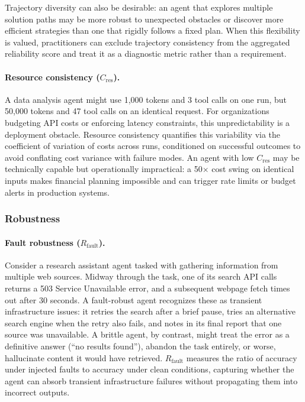 \documentclass[11pt]{article}
\begin{document}
Trajectory diversity can also be desirable: an agent that explores multiple solution paths may be more robust to unexpected obstacles or discover more efficient strategies than one that rigidly follows a fixed plan. When this flexibility is valued, practitioners can exclude trajectory consistency from the aggregated reliability score and treat it as a diagnostic metric rather than a requirement.

\paragraph{Resource consistency ($C_{\text{res}}$).}
A data analysis agent might use 1{,}000 tokens and 3 tool calls on one run, but 50{,}000 tokens and 47 tool calls on an identical request.
For organizations budgeting API costs or enforcing latency constraints, this unpredictability is a deployment obstacle.
Resource consistency quantifies this variability via the coefficient of variation of costs across runs, conditioned on successful outcomes to avoid conflating cost variance with failure modes.
An agent with low $C_{\text{res}}$ may be technically capable but operationally impractical: a 50$\times$ cost swing on identical inputs makes financial planning impossible and can trigger rate limits or budget alerts in production systems.

\subsubsection{Robustness}

\paragraph{Fault robustness ($R_{\text{fault}}$).}
Consider a research assistant agent tasked with gathering information from multiple web sources.
Midway through the task, one of its search API calls returns a 503 Service Unavailable error, and a subsequent webpage fetch times out after 30 seconds.
A fault-robust agent recognizes these as transient infrastructure issues: it retries the search after a brief pause, tries an alternative search engine when the retry also fails, and notes in its final report that one source was unavailable.
A brittle agent, by contrast, might treat the error as a definitive answer (``no results found''), abandon the task entirely, or worse, hallucinate content it would have retrieved.
$R_{\text{fault}}$ measures the ratio of accuracy under injected faults to accuracy under clean conditions, capturing whether the agent can absorb transient infrastructure failures without propagating them into incorrect outputs.
\end{document}
